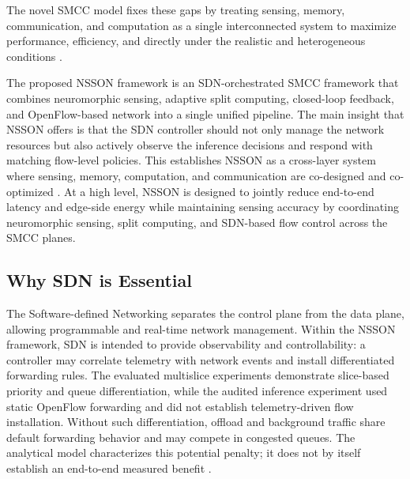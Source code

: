 \documentclass[journal]{IEEEtran}
\newcommand{\revblue}[1]{\textcolor{revblue}{#1}}
\begin{document}
The novel SMCC model fixes these gaps by treating sensing, memory, communication, and computation as a single interconnected system to maximize performance, efficiency, and directly under the realistic and heterogeneous conditions \cite{10812728,9453402,xie2023edge,chiang2023management}.

The proposed NSSON framework is an SDN-orchestrated SMCC framework that combines neuromorphic sensing, adaptive split computing, closed-loop feedback, and OpenFlow-based network into a single unified pipeline. The main insight that NSSON offers is that the SDN controller should not only manage the network resources but also actively observe the inference decisions and respond with matching flow-level policies. This establishes NSSON as a cross-layer system where sensing, memory, computation, and communication are co-designed and co-optimized \cite{zeb2023toward,fan2025latency,zhu2023pushing}. At a high level, NSSON is designed to jointly reduce end-to-end latency and edge-side energy while maintaining sensing accuracy by coordinating neuromorphic sensing, split computing, and SDN-based flow control across the SMCC planes.


\subsection{Why SDN is Essential}

The Software-defined Networking separates the control plane from the data plane, allowing programmable and real-time network management. Within the NSSON framework, SDN is intended to provide observability and controllability: a controller may correlate telemetry with network events and install differentiated forwarding rules. The evaluated multislice experiments demonstrate slice-based priority and queue differentiation, while the audited inference experiment used static OpenFlow forwarding and did not establish telemetry-driven flow installation. Without such differentiation, offload and background traffic share default forwarding behavior and may compete in congested queues. The analytical model characterizes this potential penalty; it does not by itself establish an end-to-end measured benefit \cite{kreutz2014software,mckeown2008openflow,gude2008nox,siddiqui2022toward,jazaeri2021edge,lo2023sdn,ray2025internet}.
\end{document}
